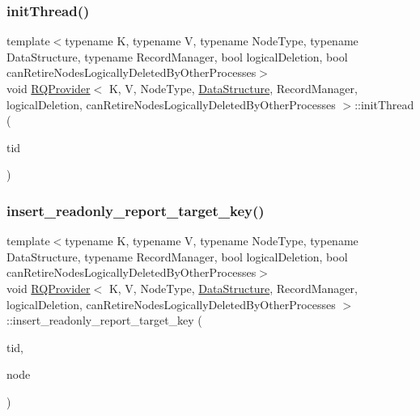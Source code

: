 \mbox{\label{classRQProvider_a3485da4cb5f94a1229cd31578b088f85}} 
\subsubsection{\texorpdfstring{init\+Thread()}{initThread()}\hspace{0.1cm}{\footnotesize\ttfamily [5/5]}}
{\footnotesize\ttfamily template$<$typename K, typename V, typename Node\+Type, typename Data\+Structure, typename Record\+Manager, bool logical\+Deletion, bool can\+Retire\+Nodes\+Logically\+Deleted\+By\+Other\+Processes$>$ \\
void \hyperlink{classRQProvider}{R\+Q\+Provider}$<$ K, V, Node\+Type, \hyperlink{classDataStructure}{Data\+Structure}, Record\+Manager, logical\+Deletion, can\+Retire\+Nodes\+Logically\+Deleted\+By\+Other\+Processes $>$\+::init\+Thread (\begin{DoxyParamCaption}\item[{const int}]{tid }\end{DoxyParamCaption})\hspace{0.3cm}{\ttfamily [inline]}}

\mbox{\label{classRQProvider_a35662316afad25dc2d873fcc8719651e}} 
\subsubsection{\texorpdfstring{insert\+\_\+readonly\+\_\+report\+\_\+target\+\_\+key()}{insert\_readonly\_report\_target\_key()}}
{\footnotesize\ttfamily template$<$typename K, typename V, typename Node\+Type, typename Data\+Structure, typename Record\+Manager, bool logical\+Deletion, bool can\+Retire\+Nodes\+Logically\+Deleted\+By\+Other\+Processes$>$ \\
void \hyperlink{classRQProvider}{R\+Q\+Provider}$<$ K, V, Node\+Type, \hyperlink{classDataStructure}{Data\+Structure}, Record\+Manager, logical\+Deletion, can\+Retire\+Nodes\+Logically\+Deleted\+By\+Other\+Processes $>$\+::insert\+\_\+readonly\+\_\+report\+\_\+target\+\_\+key (\begin{DoxyParamCaption}\item[{const int}]{tid,  }\item[{Node\+Type $\ast$const}]{node }\end{DoxyParamCaption})\hspace{0.3cm}{\ttfamily [inline]}}

